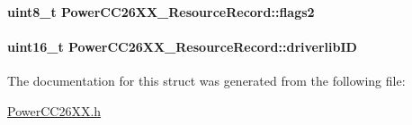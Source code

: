 \paragraph[{flags2}]{\setlength{\rightskip}{0pt plus 5cm}uint8\+\_\+t Power\+C\+C26\+X\+X\+\_\+\+Resource\+Record\+::flags2}\label{struct_power_c_c26_x_x___resource_record_af8469571ff36b1039d0082893d44fcaa}
\paragraph[{driverlib\+I\+D}]{\setlength{\rightskip}{0pt plus 5cm}uint16\+\_\+t Power\+C\+C26\+X\+X\+\_\+\+Resource\+Record\+::driverlib\+I\+D}\label{struct_power_c_c26_x_x___resource_record_a680b221cae593cd6d2d66182992c4bc6}


The documentation for this struct was generated from the following file\+:\begin{DoxyCompactItemize}
\item 
\hyperlink{_power_c_c26_x_x_8h}{Power\+C\+C26\+X\+X.\+h}\end{DoxyCompactItemize}
